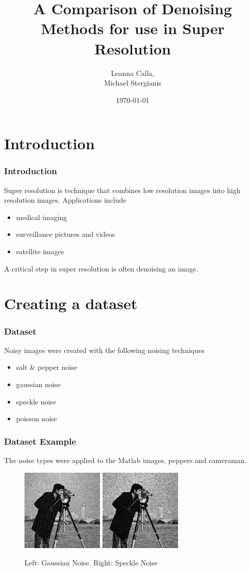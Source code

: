 \documentclass{beamer}
\title{A Comparison of Denoising Methods for use in Super Resolution}
\author{Leanna Calla,\\Michael Stergianis}
\institute{University of Ontario Institute of Technology}
\date{\today}
\begin{document}
\frame{\titlepage}
\section{Introduction}
\begin{frame}
  \frametitle{Introduction}
  Super resolution is technique that combines low resolution images
  into high resolution images. Applications include
  \begin{itemize}
  \item medical imaging
  \item surveillance pictures and videos
  \item satellite images
  \end{itemize}
  A critical step in super resolution is
  often denoising an image.
\end{frame}
%
\section{Creating a dataset}
%
\begin{frame}
  \frametitle{Dataset}
  Noisy images were created with the following noising techniques
  \begin{itemize}
  \item salt \& pepper noise
  \item gaussian noise
  \item speckle noise
  \item poisson noise
  \end{itemize}
\end{frame}
%
\begin{frame}
  \frametitle{Dataset Example}
  The noise types were applied to the Matlab images, peppers and
  cameraman.
  \begin{figure}
    \centering
    \includegraphics[width =
    0.35\textwidth]{../images/camera_noisy2.png}
    \includegraphics[width =
    0.35\textwidth]{../images/camera_noisy3.png}
    \caption{Left: Gaussian Noise. Right: Speckle Noise}
  \end{figure}
\end{frame}
\end{document}
